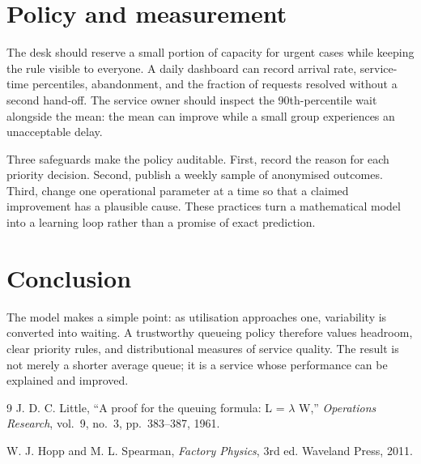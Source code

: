 \documentclass[final]{coursepaper}
\begin{document}
\section{Policy and measurement}

The desk should reserve a small portion of capacity for urgent cases while
keeping the rule visible to everyone.  A daily dashboard can record arrival
rate, service-time percentiles, abandonment, and the fraction of requests
resolved without a second hand-off.  The service owner should inspect the
90th-percentile wait alongside the mean: the mean can improve while a small
group experiences an unacceptable delay.

Three safeguards make the policy auditable.  First, record the reason for each
priority decision.  Second, publish a weekly sample of anonymised outcomes.
Third, change one operational parameter at a time so that a claimed
improvement has a plausible cause.  These practices turn a mathematical
model into a learning loop rather than a promise of exact prediction.

\section{Conclusion}

The model makes a simple point: as utilisation approaches one, variability is
converted into waiting.  A trustworthy queueing policy therefore values
headroom, clear priority rules, and distributional measures of service quality.
The result is not merely a shorter average queue; it is a service whose
performance can be explained and improved.

\begin{thebibliography}{9}
J. D. C. Little, ``A proof for the queuing formula: L = $\lambda$ W,''
\emph{Operations Research}, vol.~9, no.~3, pp.~383--387, 1961.

W. J. Hopp and M. L. Spearman, \emph{Factory Physics}, 3rd ed.
Waveland Press, 2011.
\end{thebibliography}
\end{document}
